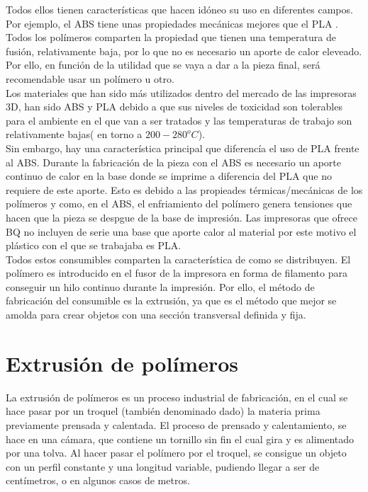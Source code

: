 Todos ellos tienen características que hacen idóneo su uso en diferentes campos. Por ejemplo, el ABS tiene unas propiedades mecánicas mejores que el PLA \cite{tfg_antonio}. Todos los polímeros comparten la propiedad que tienen una temperatura de fusión, relativamente baja, por lo que no es necesario un aporte de calor eleveado. Por ello, en función de la utilidad que se vaya a dar a la pieza final, será recomendable usar un polímero u otro.\\

Los materiales que han sido más utilizados dentro del mercado de las impresoras 3D, han sido ABS y PLA debido a que sus niveles de toxicidad son tolerables para el ambiente en el que van a ser tratados y las temperaturas de trabajo son relativamente bajas( en torno a $200-280 ^oC$).\\

Sin embargo, hay una característica principal que diferencía el uso de PLA frente al ABS. Durante la fabricación de la pieza con el ABS es necesario un aporte continuo de calor en la base donde se imprime a diferencia del PLA que no requiere de este aporte. Esto es debido a las propieades térmicas/mecánicas de los polímeros y como, en el ABS, el enfriamiento del polímero genera tensiones que hacen que la pieza se despgue de la base de impresión. Las impresoras que ofrece BQ no incluyen de serie una base que aporte calor al material por este motivo el plástico con el que se trabajaba es PLA.\\

Todos estos consumibles comparten la característica de como se distribuyen. El polímero es introducido en el fusor de la impresora en forma de filamento para conseguir un hilo continuo durante la impresión. Por ello, el método de fabricación del consumible es la extrusión, ya que es el método que mejor se amolda para crear objetos con una sección transversal definida y fija.

\section{Extrusión de polímeros}
\label{sec:extrusion}

La extrusión de polímeros es un proceso industrial de fabricación, en el cual se hace pasar por un troquel (también denominado dado) la materia prima previamente prensada y calentada. El proceso de prensado y calentamiento, se hace en una cámara, que contiene un tornillo sin fin el cual gira y es alimentado por una tolva. Al hacer pasar el polímero por el troquel, se consigue un objeto con un perfil constante y una longitud variable, pudiendo llegar a ser de centímetros, o en algunos casos de metros.\\

